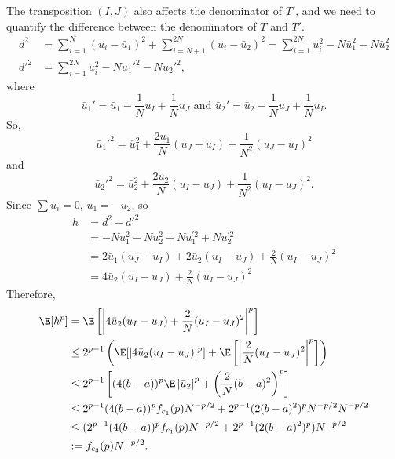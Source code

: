 The transposition $(I, J)$ also affects the denominator of $T'$, and we need to quantify the
difference between the denominators of $T$ and $T'$.  
\begin{align*}
    d^2 &= \sum_{i=1}^N (u_i - \bar{u}_1)^2 + \sum_{i=N+1}^{2N} (u_i -
    \bar{u}_2)^2 = \sum_{i=1}^{2N} u_i^2 - N \bar{u}_1^2 - N
    \bar{u}_2^2 \\
    d'^2 &= \sum_{i=1}^{2N} u_i^2 - N \bar{u}_1'^2 - N \bar{u}_2'^2,  
\end{align*}
where
\begin{equation*}
  \label{eq:6}
  \bar{u}_1' = \bar{u}_1 - \frac{1}{N}u_I + \frac{1}{N}u_J \text{ and }
  \bar{u}_2' = \bar{u}_2 - \frac{1}{N}u_J + \frac{1}{N}u_I.
\end{equation*}
So, 
\begin{equation*}
  \label{eq:7}
  \bar{u}_1'^2 = \bar{u}_1^2 + \frac{2\bar{u}_1}{N}(u_J-u_I) +
  \frac{1}{N^2}(u_J-u_I)^2
\end{equation*}
and
\begin{equation*}
  \label{eq:8}
  \bar{u}_2'^2 = \bar{u}_2^2 + \frac{2\bar{u}_2}{N}(u_I-u_J) +
  \frac{1}{N^2}(u_I-u_J)^2.
\end{equation*}
Since $\sum u_i = 0$, $\bar{u}_1 = -\bar{u}_2$, so
\begin{align*}
  h &= d^2-d'^2 \\
  &= -N \bar{u}_1^2 -N \bar{u}_2^2 + N\bar{u}_1^{'2} + N\bar{u}_2^{'2} \\
  &= 2\bar{u}_1(u_J-u_I) + 2\bar{u}_2(u_I-u_J)+\frac{2}{N}(u_I-u_J)^2 \\
  &= 4\bar{u}_2(u_I-u_J) + \frac{2}{N}(u_I-u_J)^2
\end{align*}
Therefore,
\begin{align}
  \E[h^p] &= \E \left [ \left | 4\bar{u}_2(u_I-u_J) +
      \frac{2}{N}(u_I-u_J)^2 \right |^p \right ] \nonumber \\
  &\leq 2^{p-1} \left ( \E[|4\bar{u}_2(u_I-u_J)|^p] 
    + \E \left [ \left |\frac{2}{N}(u_I-u_J)^2 \right |^p \right ]
  \right ) \nonumber \\
  &\leq 2^{p-1}\left [ (4(b-a))^p \E \left | \bar{u}_2 \right |^p
    + \left ( \frac{2}{N}(b-a)^2 \right )^p \right ] \nonumber \\
  &\leq 2^{p-1} (4(b-a))^p f_{c_1}(p)N^{-p/2} +
  2^{p-1}(2(b-a)^2)^pN^{-p/2}N^{-p/2} \nonumber \\
  &\leq (2^{p-1} (4(b-a))^p f_{c_1}(p)N^{-p/2} +
  2^{p-1}(2(b-a)^2)^p)N^{-p/2} \nonumber \\
  &:= f_{c_3}(p)N^{-p/2} \label{def:hp}.
\end{align}

